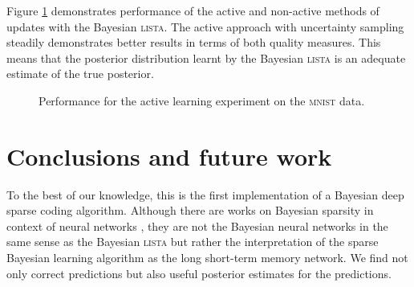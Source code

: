 \documentclass{article}
\begin{document}
Figure \ref{fig:active_learning_mnist} demonstrates performance of the active and non-active methods of updates with the Bayesian \textsc{lista}. The active approach with uncertainty sampling steadily demonstrates better results in terms of both quality measures. This means that the posterior distribution learnt by the Bayesian \textsc{lista} is an adequate estimate of the true posterior.
\begin{figure}[h]
\centering
{}%
\caption{Performance for the active learning experiment on the \textsc{mnist} data. }
\label{fig:active_learning_mnist}
\end{figure}

\section{Conclusions and future work}
\label{sec:conclusions}
To the best of our knowledge, this is the first implementation of a Bayesian deep sparse coding algorithm. Although there are works on Bayesian sparsity in context of neural networks \cite{he2017bayesian}, they are not the Bayesian neural networks in the same sense as the Bayesian \textsc{lista} but rather the interpretation of the sparse Bayesian  learning algorithm as the long short-term memory network. We find not only correct predictions but also useful posterior estimates for the predictions.
\end{document}
